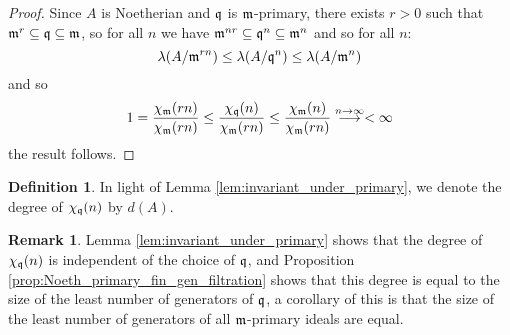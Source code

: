 \documentclass[12pt]{article}
\theoremstyle{plain}
\theoremstyle{definition}
\newtheorem{defn}[thm]{Definition} %
\newtheorem{remark}[thm]{Remark}
\newcommand{\lto}{\longrightarrow}
\begin{document}
\begin{proof}
Since $A$ is Noetherian and $\frak{q}$ is $\frak{m}$-primary, there exists $r > 0$ such that $\frak{m}^r \subseteq \frak{q} \subseteq \frak{m}$, so for all $n$ we have $\frak{m}^{nr} \subseteq \frak{q}^n \subseteq \frak{m}^n$ and so for all $n$:
\[\lambda(A/\frak{m}^{rn}) \leq \lambda(A/\frak{q}^n) \leq \lambda(A/\frak{m}^n)\]
and so
\[1 = \frac{\chi_{\frak{m}}(rn)}{\chi_{\frak{m}}(rn)} \leq \frac{\chi_\frak{q}(n)}{\chi_\frak{m}(rn)} \leq \frac{\chi_{\frak{m}}(n)}{\chi_\frak{m}(rn)}\stackrel{n \to \infty}{\lto} < \infty\]
the result follows.
\end{proof}
\begin{defn}
\label{def:polynomial_degree} In light of Lemma \ref{lem:invariant_under_primary}, we denote the degree of $\chi_\frak{q}(n)$ by $d(A)$.
\end{defn}
\begin{remark}
Lemma \ref{lem:invariant_under_primary} shows that the degree of $\chi_\frak{q}(n)$ is independent of the choice of $\frak{q}$, and Proposition \ref{prop:Noeth_primary_fin_gen_filtration} shows that this degree is equal to the size of the least number of generators of $\frak{q}$, a corollary of this is that the size of the least number of generators of all $\frak{m}$-primary ideals are equal.
\end{remark}
\end{document}
